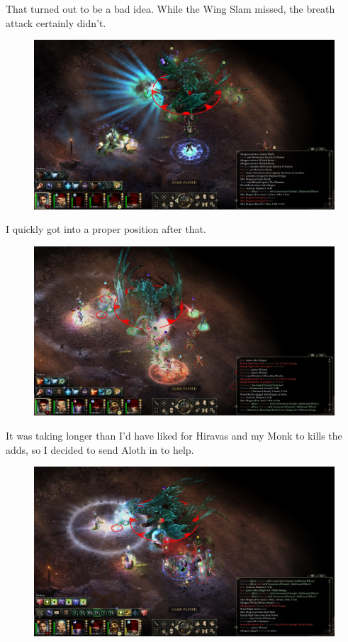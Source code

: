 \documentclass{article}
\begin{document}
That turned out to be a bad idea.  While the Wing Slam missed, the breath attack certainly didn't.

\begin{figure}
\includegraphics[scale=0.33]{files/blog/2019_03_17_pillars_of_eternity_path_of_the_damned_act_iv/2019_03_17_dragon2_03.jpg}
\end{figure}

I quickly got into a proper position after that.

\begin{figure}
\includegraphics[scale=0.33]{files/blog/2019_03_17_pillars_of_eternity_path_of_the_damned_act_iv/2019_03_17_dragon2_04.jpg}
\end{figure}

It was taking longer than I'd have liked for Hiravas and my Monk to kills the adds, so I decided to send Aloth in to help.

\begin{figure}
\includegraphics[scale=0.33]{files/blog/2019_03_17_pillars_of_eternity_path_of_the_damned_act_iv/2019_03_17_dragon2_05.jpg}
\end{figure}
\end{document}
